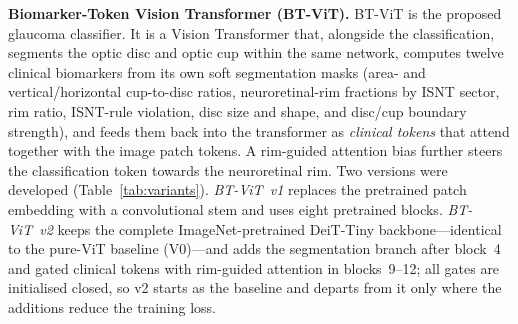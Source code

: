 \documentclass[10pt]{article}
\begin{document}
\noindent\textbf{Biomarker-Token Vision Transformer (BT-ViT).}
BT-ViT is the proposed glaucoma classifier. It is a Vision Transformer that, alongside the
classification, segments the optic disc and optic cup within the same network, computes twelve clinical
biomarkers from its own soft segmentation masks (area- and vertical/horizontal cup-to-disc ratios,
neuroretinal-rim fractions by ISNT sector, rim ratio, ISNT-rule violation, disc size and shape, and
disc/cup boundary strength), and feeds them back into the transformer as \emph{clinical tokens} that attend
together with the image patch tokens. A rim-guided attention bias further steers the classification token
towards the neuroretinal rim. Two versions were developed (Table~\ref{tab:variants}). \emph{BT-ViT~v1}
replaces the pretrained patch embedding with a convolutional stem and uses eight pretrained blocks.
\emph{BT-ViT~v2} keeps the complete ImageNet-pretrained DeiT-Tiny backbone---identical to the pure-ViT
baseline (V0)---and adds the segmentation branch after block~4 and gated clinical tokens with rim-guided
attention in blocks~9--12; all gates are initialised closed, so v2 starts as the baseline and departs from
it only where the additions reduce the training loss.

\vspace{1em}
\end{document}

